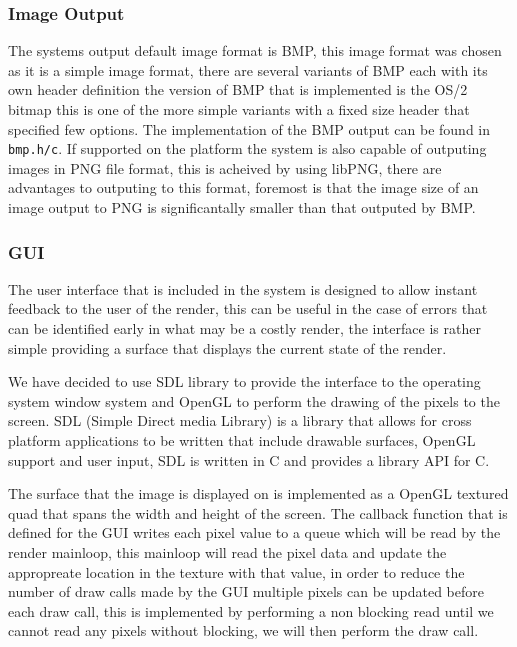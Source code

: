 \subsubsection{Image Output}

The systems output default image format is BMP, this image format was chosen as it is a simple image format, there are
several variants of BMP each with its own header definition the version of BMP that is implemented is the OS/2 bitmap this is
one of the more simple variants with a fixed size header that specified few options. The implementation of the BMP output can
be found in \texttt{bmp.h/c}. If supported on the platform the system is also capable of outputing images in PNG file format,
this is acheived by using libPNG, there are advantages to outputing to this format, foremost is that the image size of an
image output to PNG is significantally smaller than that outputed by BMP.

\subsubsection{GUI}

The user interface that is included in the system is designed to allow instant feedback to the user of the render, this can be
useful in the case of errors that can be identified early in what may be a costly render, the interface is rather simple
providing a surface that displays the current state of the render.

We have decided to use SDL library to provide the interface to the operating system window system and OpenGL to perform the 
drawing of the pixels to the screen. SDL (Simple Direct media Library) is a library that allows for cross platform applications to be written that include
drawable surfaces, OpenGL support and user input, SDL is written in C and provides a library API for C.

The surface that the image is displayed on is implemented as a OpenGL textured quad that spans the width and height of the screen.
The callback function that is defined for the GUI writes each pixel value to a queue which will be read by the render mainloop,
this mainloop will read the pixel data and update the appropreate location in the texture with that value, in order to reduce the
number of draw calls made by the GUI multiple pixels can be updated before each draw call, this is implemented by performing
a non blocking read until we cannot read any pixels without blocking, we will then perform the draw call.

